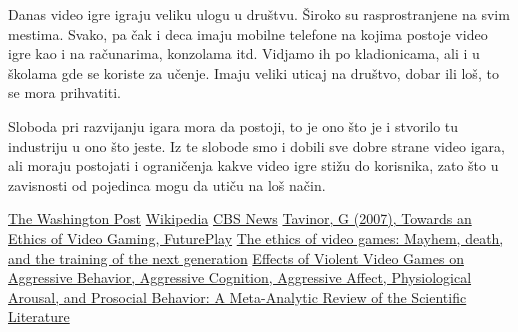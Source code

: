\documentclass[a4paper]{article}
\begin{document}
Danas video igre igraju veliku ulogu u društvu. Široko su rasprostranjene na svim mestima. Svako, pa čak i deca
imaju mobilne telefone na kojima postoje video igre kao i na računarima, konzolama itd. Vidjamo ih po kladionicama, ali i u školama gde se koriste za učenje.
Imaju veliki uticaj na društvo, dobar ili loš, to se mora prihvatiti.

Sloboda pri razvijanju igara mora da postoji, to je ono što je i stvorilo tu industriju u ono što jeste. Iz te slobode
smo i dobili sve dobre strane video igara, ali moraju postojati i ograničenja kakve video igre stižu do korisnika, zato što
u zavisnosti od pojedinca mogu da utiču na loš način.

\newpage

\appendix

\begin{thebibliography}{6}

 \href{https://www.washingtonpost.com/archive/politics/2006/02/14/virtual-reality-prepares-soldiers-for-real-war-span-classbankheadyoung-warriors-say-video-shooter-games-helped-hone-their-skillsspan/15996806-3a4d-4374-b066-38c5f5c35659/}{The Washington Post}
 \href{https://en.wikipedia.org/wiki/America%27s_Army#Controversy}{Wikipedia}
 \href{https://www.cbsnews.com/news/can-a-video-game-lead-to-murder-04-03-2005/}{CBS News}
 \href{https://www.ida.liu.se/~TDDI82/etik/Towards_an_Ethics_of_Video_Gaming.pdf}{Tavinor, G (2007), Towards an Ethics of Video Gaming, FuturePlay}
 \href{https://www.researchgate.net/publication/220198908_The_ethics_of_video_games_Mayhem_death_and_the_training_of_the_next_generation}{The ethics of video games: Mayhem, death, and the training of the next generation}
 \href{https://www.researchgate.net/publication/11792416_Effects_of_Violent_Video_Games_on_Aggressive_Behavior_Aggressive_Cognition_Aggressive_Affect_Physiological_Arousal_and_Prosocial_Behavior_A_Meta-Analytic_Review_of_the_Scientific_Literature}{Effects of Violent Video Games on Aggressive Behavior, Aggressive Cognition, Aggressive Affect, Physiological Arousal, and Prosocial Behavior: A Meta-Analytic Review of the Scientific Literature}

\end{thebibliography}
\end{document}
